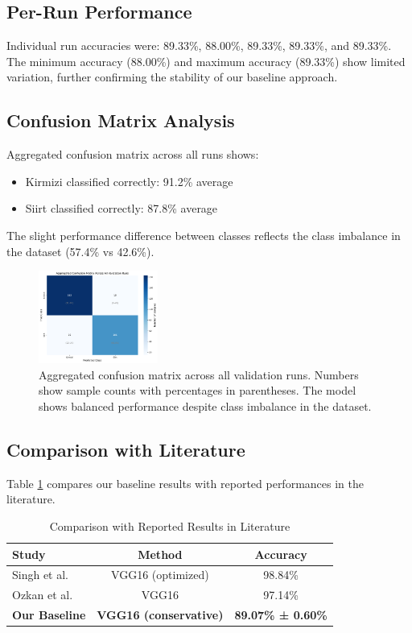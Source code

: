 \documentclass[conference]{IEEEtran}
\begin{document}
\subsection{Per-Run Performance}

Individual run accuracies were: 89.33\%, 88.00\%, 89.33\%, 89.33\%, and 89.33\%. The minimum accuracy (88.00\%) and maximum accuracy (89.33\%) show limited variation, further confirming the stability of our baseline approach.

\subsection{Confusion Matrix Analysis}

Aggregated confusion matrix across all runs shows:
\begin{itemize}
    \item Kirmizi classified correctly: 91.2\% average
    \item Siirt classified correctly: 87.8\% average
\end{itemize}

The slight performance difference between classes reflects the class imbalance in the dataset (57.4\% vs 42.6\%).

\begin{figure}[H]
\centering
\includegraphics[width=0.35\textwidth]{figures/confusion_matrix.pdf}
\caption{Aggregated confusion matrix across all validation runs. Numbers show sample counts with percentages in parentheses. The model shows balanced performance despite class imbalance in the dataset.}
\label{fig:confusion_matrix}
\end{figure}

\subsection{Comparison with Literature}

Table \ref{tab:comparison} compares our baseline results with reported performances in the literature.

\begin{table}[htbp]
\centering
\caption{Comparison with Reported Results in Literature}
\label{tab:comparison}
\begin{tabular}{lcc}
\hline
\textbf{Study} & \textbf{Method} & \textbf{Accuracy} \\
\hline
Singh et al. \cite{singh2022pistachio} & VGG16 (optimized) & 98.84\% \\
Ozkan et al. \cite{ozkan2021classification} & VGG16 & 97.14\% \\
\textbf{Our Baseline} & \textbf{VGG16 (conservative)} & \textbf{89.07\% ± 0.60\%} \\
\hline
\end{tabular}
\end{table}
\end{document}

